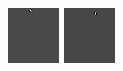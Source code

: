 \begin{figure}[ht]
\begin{center}
  \includegraphics[width=\columnwidth/11]{ch5/figures/mutinf_07.png}
  \includegraphics[width=\columnwidth/11]{ch5/figures/mutinf_08.png}

\end{center}
\end{figure}
